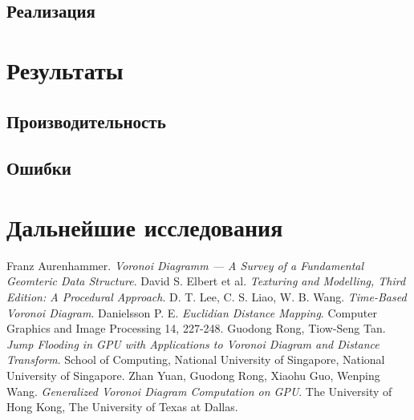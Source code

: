 \documentclass[12pt]{article}
\begin{document}
\subsection{Реализация}
\section{Результаты}
\subsection{Производительность}
\subsection{Ошибки}
\section{Дальнейшие исследования}

\pagebreak

\begin{thebibliography}{10}
 Franz Aurenhammer. \textit{Voronoi Diagramm --- A Survey of a Fundamental Geomteric Data Structure}.
 David S. Elbert et al. \textit{Texturing and Modelling, Third Edition: A Procedural Approach}.
 D. T. Lee, C. S. Liao, W. B. Wang. \textit{Time-Based Voronoi Diagram}.
 Danielsson P. E. \textit{Euclidian Distance Mapping}. Computer Graphics and Image Processing 14, 227-248.
 Guodong Rong, Tiow-Seng Tan. \textit{Jump Flooding in GPU with Applications to Voronoi Diagram and Distance Transform}. School of Computing, National University of Singapore, National University of Singapore. 
 Zhan Yuan, Guodong Rong, Xiaohu Guo, Wenping Wang. \textit{Generalized Voronoi Diagram Computation on GPU}. The University of Hong Kong, The University of Texas at Dallas.
\end{thebibliography}
\end{document}

